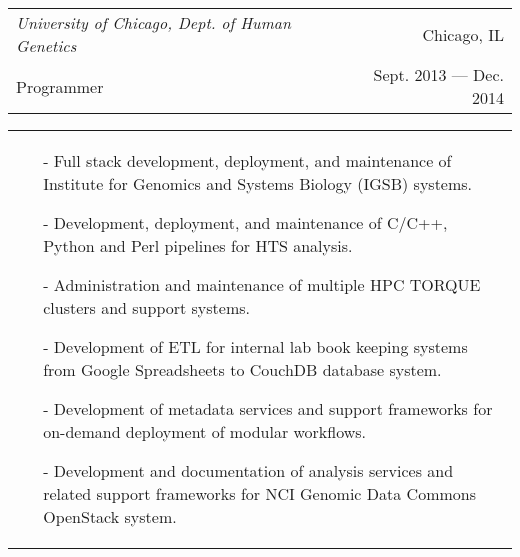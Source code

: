 \begin{tabularx}{\textwidth}{L R}
    \textit{University of Chicago, Dept. of Human Genetics} & Chicago, IL \\
    \small{Programmer} & \small{Sept. 2013 --- Dec. 2014} \\
\end{tabularx}
\begin{tabularx}{\textwidth}{X}
    \begin{small}
    \begin{itemize}
        \itemsep{}
        \item[-] Full stack development, deployment, and maintenance of Institute for Genomics and Systems Biology (IGSB) systems.
        \item[-] Development, deployment, and maintenance of C/C++, Python and Perl pipelines for HTS analysis.
        \item[-] Administration and maintenance of multiple HPC TORQUE clusters and support systems.
        \item[-] Development of ETL for internal lab book keeping systems from Google Spreadsheets to CouchDB database system.
        \item[-] Development of metadata services and support frameworks for on-demand deployment of modular workflows.
        \item[-] Development and documentation of analysis services and related support frameworks for NCI Genomic Data Commons OpenStack system.
    \end{itemize}
    \end{small}
\end{tabularx}
